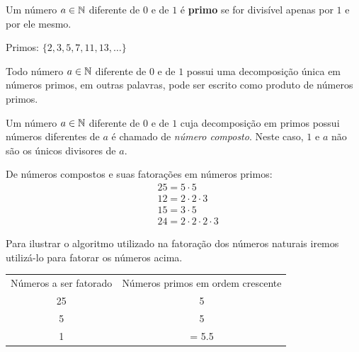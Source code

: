  \vskip0.3cm

 \colorbox{azul}{
 \begin{minipage}{0.9\linewidth}
 \begin{center}
  Um número $a \in \mathbb{N}$ diferente de $0$ e de $1$ é \textbf{primo} se for divisível apenas por $1$ e por ele mesmo.
 \end{center}
 \end{minipage}}


 \begin{exem}
 Primos: $\{2, 3, 5, 7, 11, 13, \ldots \}$
 \end{exem}

 \begin{teo}
 Todo número $a \in \mathbb{N}$ diferente de $0$ e de $1$ possui uma decomposição única em números primos, em outras palavras, pode ser escrito como produto de números primos.
 \end{teo}

 \begin{defi}
 Um número $a \in \mathbb{N}$ diferente de $0$ e de $1$ cuja decomposição em primos possui números diferentes de $a$ é chamado de \emph{número composto}. Neste caso, $1$ e $a$ não são os únicos divisores de $a$.
 \end{defi}

 \begin{exem} De números compostos e suas fatorações em números primos:
 \begin{align*}
 &25= 5 \cdot 5 \\
 &12= 2 \cdot 2 \cdot 3 \\
 &15= 3 \cdot 5 \\
 &24= 2 \cdot 2 \cdot 2 \cdot 3
 \end{align*}
 \end{exem}

 Para ilustrar o algoritmo utilizado na fatoração dos números naturais iremos utilizá-lo para fatorar os números acima.

 \begin{tabular}{c|c}
  Números a ser fatorado & Números primos em ordem crescente \\
  25 & 5 \\
  5  & 5 \\
  1  & = 5.5  \\
 \end{tabular}


